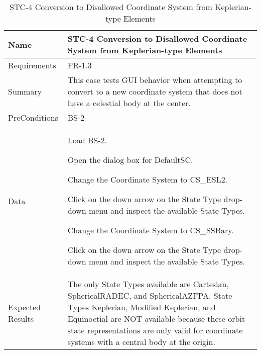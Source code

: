 \begin{table}[htbp!]
\centering
      \begin{tabular}{|p{1.05 in} |p{4.75 in} |}
      \hline
         \rowcolor[rgb]{0.8,0.8,0.8} Name & STC-4 Conversion to Disallowed Coordinate System from Keplerian-type Elements \\
         \hline
         Requirements & FR-1.3\\  \hline
         Summary &
         This  case tests GUI behavior when attempting to convert to a new coordinate system that does
         not have a celestial body at the center.
         \\     \hline
         PreConditions & BS-2\\     \hline
         Data &
         \begin{compactenum}
             \item Load BS-2.
             \item Open the dialog box for DefaultSC.
             \item Change the Coordinate System to CS\_ESL2.
             \item Click on the down arrow on the State Type drop-down menu and inspect the available State Types.
             \item Change the Coordinate System to CS\_SSBary.
             \item Click on the down arrow on the State Type drop-down menu and inspect the available State Types.
         \end{compactenum}
         \\ \hline
         Expected Results & The only State Types available are Cartesian, SphericalRADEC, and SphericalAZFPA.   State Types Keplerian, Modified Keplerian, and Equinoctial are NOT available because these orbit state representations are only valid for coordinate systems with a central body at the origin.\\
      \hline
\end{tabular}
      \label{Table: STC-4}
      \caption{STC-4 Conversion to Disallowed Coordinate System from Keplerian-type Elements }
\end{table} 